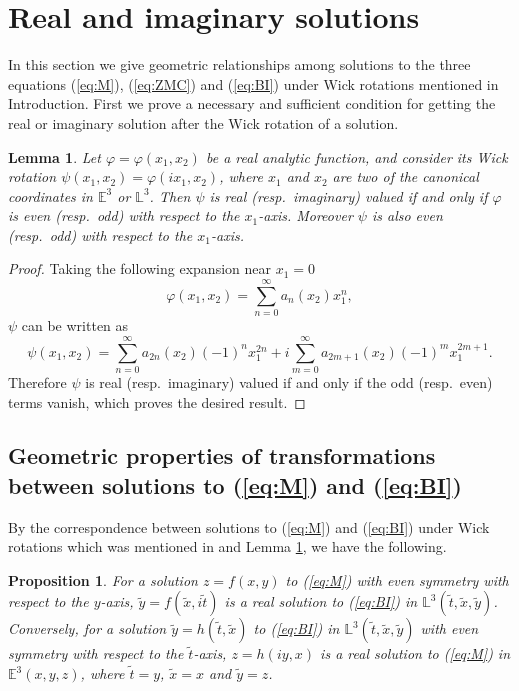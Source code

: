 \documentclass[12pt,amstex]{amsart}%
\theoremstyle{plain} %
\newtheorem{lemma}[theorem]{Lemma}
\newtheorem{proposition}[theorem]{Proposition}
\theoremstyle{definition}
\begin{document}
\section{Real and imaginary solutions}\label{Sec.3}
In this section we give geometric relationships among solutions to the three equations (\ref{eq:M}), (\ref{eq:ZMC}) and (\ref{eq:BI}) under Wick rotations mentioned in Introduction. First we prove a necessary and sufficient condition for getting the real or imaginary solution after the Wick rotation of a solution.
\begin{lemma}\label{lemma:symmetry}
Let $\varphi=\varphi(x_1,x_2)$ be a real analytic function, and consider its Wick rotation $\psi(x_1,x_2)=\varphi(ix_1,x_2)$, where $x_1$ and $x_2$ are two of the canonical coordinates in $\mathbb{E}^3$ or $\mathbb{L}^3$. Then $\psi$ is real (resp.\ imaginary) valued if and only if $\varphi$ is even (resp.\ odd) with respect to the $x_1$-axis. Moreover $\psi$ is also even (resp.\ odd) with respect to the $x_1$-axis.
\end{lemma}
\begin{proof}
Taking the following expansion near $x_1=0$
\begin{equation*}
\varphi(x_1,x_2)=\sum_{n=0}^{\infty}a_n(x_2)x_1^n,
\end{equation*}
$\psi$ can be written as
\begin{equation*}
\psi(x_1,x_2)=\sum_{n=0}^{\infty}a_{2n}(x_2)(-1)^nx_1^{2n}+i\sum_{m=0}^{\infty}a_{2m+1}(x_2)(-1)^mx_1^{2m+1}.
\end{equation*}
Therefore $\psi$ is real (resp.\ imaginary) valued if and only if the odd (resp.\ even) terms vanish, which proves the desired result.
\end{proof}

 \subsection{Geometric properties of transformations between solutions to (\ref{eq:M}) and (\ref{eq:BI})}
By the correspondence between solutions to (\ref{eq:M}) and (\ref{eq:BI}) under Wick rotations which was mentioned in \cite{D,Kamien} and Lemma \ref{lemma:symmetry}, we have the following.

\begin{proposition}\label{prop:BI and M_even}
For a solution $z=f(x,y)$ to (\ref{eq:M}) with even symmetry with respect to the $y$-axis, $\tilde{y}=f(\tilde{x},i\tilde{t})$ is a real solution to (\ref{eq:BI}) in $\mathbb{L}^3(\tilde{t},\tilde{x},\tilde{y})$. Conversely, for a solution $\tilde{y}=h(\tilde{t},\tilde{x})$ to (\ref{eq:BI}) in $\mathbb{L}^3(\tilde{t},\tilde{x},\tilde{y})$ with even symmetry with respect to the $\tilde{t}$-axis, $z=h(iy,x)$ is a real solution to (\ref{eq:M}) in $\mathbb{E}^3(x,y,z)$, where $\tilde{t}=y$, $\tilde{x}=x$ and $\tilde{y}=z$.
\end{proposition}
\end{document}

